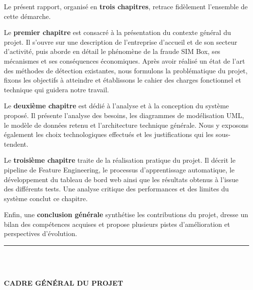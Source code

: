 \documentclass[12pt, oneside, a4paper]{report}
\begin{document}
Le présent rapport, organisé en \textbf{trois chapitres}, retrace fidèlement l'ensemble de cette démarche.

Le \textbf{premier chapitre} est consacré à la présentation du contexte général du projet. Il s'ouvre sur une description de l'entreprise d'accueil et de son secteur d'activité, puis aborde en détail le phénomène de la fraude SIM Box, ses mécanismes et ses conséquences économiques. Après avoir réalisé un état de l'art des méthodes de détection existantes, nous formulons la problématique du projet, fixons les objectifs à atteindre et établissons le cahier des charges fonctionnel et technique qui guidera notre travail.

Le \textbf{deuxième chapitre} est dédié à l'analyse et à la conception du système proposé. Il présente l'analyse des besoins, les diagrammes de modélisation UML, le modèle de données retenu et l'architecture technique générale. Nous y exposons également les choix technologiques effectués et les justifications qui les sous-tendent.

Le \textbf{troisième chapitre} traite de la réalisation pratique du projet. Il décrit le pipeline de Feature Engineering, le processus d'apprentissage automatique, le développement du tableau de bord web ainsi que les résultats obtenus à l'issue des différents tests. Une analyse critique des performances et des limites du système conclut ce chapitre.

Enfin, une \textbf{conclusion générale} synthétise les contributions du projet, dresse un bilan des compétences acquises et propose plusieurs pistes d'amélioration et perspectives d'évolution.

\clearpage
\thispagestyle{fancy} %

\noindent\rule[-0.2cm]{0.45cm}{1.2cm}\hspace{0.15cm}%
\raisebox{0.85cm}{\rule{0.85\textwidth}{0.5pt}}\\[0.3cm]
\noindent{}\\[1cm]

\begin{center}
    {\huge\textbf{CADRE GÉNÉRAL DU PROJET}}
\end{center}
\vspace{1cm}
\end{document}
